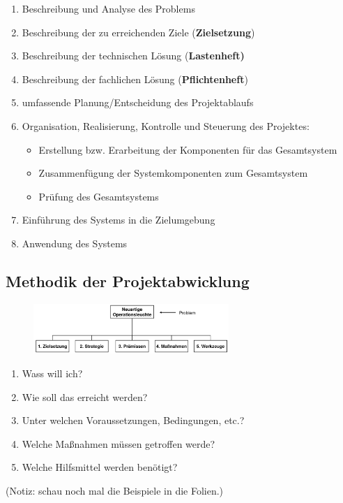 \documentclass[11pt,a4paper]{article}
\begin{document}
\begin{enumerate}
\item Beschreibung und Analyse des Problems
\item Beschreibung der zu erreichenden Ziele (\textbf{Zielsetzung})
\item Beschreibung der technischen Lösung (\textbf{Lastenheft)}
\item Beschreibung der fachlichen Lösung (\textbf{Pflichtenheft})
\item umfassende Planung/Entscheidung des Projektablaufs
\item Organisation, Realisierung, Kontrolle und Steuerung des Projektes:
	\begin{itemize}
	\item Erstellung bzw. Erarbeitung der Komponenten für das Gesamtsystem
	\item Zusammenfügung der Systemkomponenten zum Gesamtsystem
	\item Prüfung des Gesamtsystems
	\end{itemize}
\item Einführung des Systems in die Zielumgebung
\item Anwendung des Systems
\end{enumerate}

\subsection{Methodik der Projektabwicklung}
\begin{figure}[H]
	\centering

	\includegraphics[width=0.66\textwidth]{ch6/methodik}

\end{figure}

\begin{enumerate}
\item Wass will ich?
\item Wie soll das erreicht werden?
\item Unter welchen Voraussetzungen, Bedingungen, etc.?
\item Welche Maßnahmen müssen getroffen werde?
\item Welche Hilfsmittel werden benötigt?
\end{enumerate}	
\noindent
(Notiz: schau noch mal die Beispiele in die Folien.)
\end{document}
